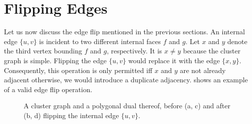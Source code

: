 \section{Flipping Edges}
\label{sect:flipping-edges}

Let us now discuss the edge flip mentioned in the previous sections.
An internal edge $\{u,v\}$ is incident to two different internal faces $f$ and $g$.
Let $x$ and $y$ denote the third vertex bounding $f$ and $g$, respectively.
It is $x \neq y$ because the cluster graph is simple.
Flipping the edge $\{u,v\}$ would replace it with the edge $\{x,y\}$.
Consequently, this operation is only permitted iff $x$ and $y$ are not already adjacent \emdash{} otherwise, we would introduce a duplicate adjacency.
 shows an example of a valid edge flip operation.

\begin{figure}[H]
	\centering
	\quad
	\qquad
	\quad
	\caption{A cluster graph and a polygonal dual thereof, before (a, c) and after (b, d) flipping the internal edge $\{u,v\}$.}
	\label{fig:flip-edge-example-internal}
\end{figure}


